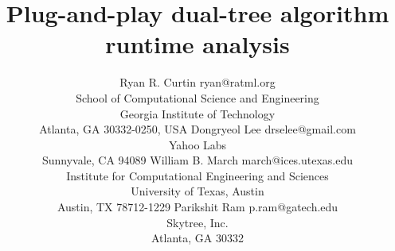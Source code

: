 \documentclass[twoside,11pt]{article} %
\begin{document}
\title{Plug-and-play dual-tree algorithm runtime analysis}

\author{\name Ryan R. Curtin \email ryan@ratml.org\\
  \addr School of Computational Science and Engineering\\
  Georgia Institute of Technology\\
  Atlanta, GA 30332-0250, USA
  \AND
  \name Dongryeol Lee \email drselee@gmail.com\\
  \addr Yahoo Labs\\
  Sunnyvale, CA 94089
  \AND
  \name William B. March \email march@ices.utexas.edu\\
  \addr Institute for Computational Engineering and Sciences\\
  University of Texas, Austin\\
  Austin, TX 78712-1229
  \AND
  \name Parikshit Ram \email p.ram@gatech.edu\\
  \addr Skytree, Inc.\\
  Atlanta, GA 30332
}


\maketitle
\end{document}
